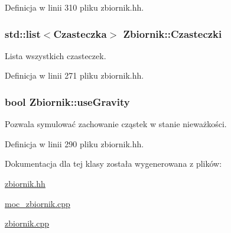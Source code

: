 Definicja w linii 310 pliku zbiornik.\-hh.

\hypertarget{class_zbiornik_a751209f2f02a7eaf3b7a3283d8fcd3ad}{
\subsubsection[{Czasteczki}]{\setlength{\rightskip}{0pt plus 5cm}std\-::list$<${\bf Czasteczka}$>$ Zbiornik\-::\-Czasteczki}}\label{class_zbiornik_a751209f2f02a7eaf3b7a3283d8fcd3ad}
Lista wszystkich czasteczek. 

Definicja w linii 271 pliku zbiornik.\-hh.

\hypertarget{class_zbiornik_adf42e0df5f2af3160a1ff2e1360efe8a}{
\subsubsection[{use\-Gravity}]{\setlength{\rightskip}{0pt plus 5cm}bool Zbiornik\-::use\-Gravity}}\label{class_zbiornik_adf42e0df5f2af3160a1ff2e1360efe8a}
Pozwala symulować zachowanie cząstek w stanie nieważkości. 

Definicja w linii 290 pliku zbiornik.\-hh.



Dokumentacja dla tej klasy została wygenerowana z plików\-:\begin{DoxyCompactItemize}
\item 
\hyperlink{zbiornik_8hh}{zbiornik.\-hh}\item 
\hyperlink{moc__zbiornik_8cpp}{moc\-\_\-zbiornik.\-cpp}\item 
\hyperlink{zbiornik_8cpp}{zbiornik.\-cpp}\end{DoxyCompactItemize}
